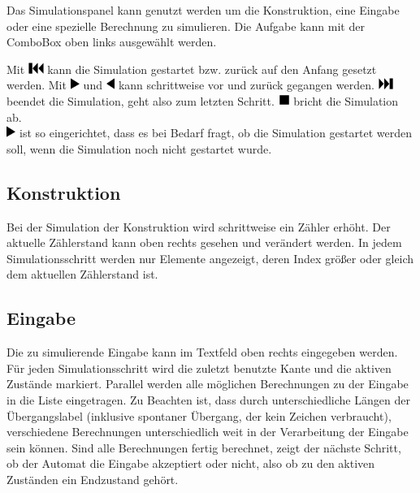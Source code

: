 Das Simulationspanel kann genutzt werden um die Konstruktion, eine Eingabe oder eine spezielle Berechnung zu simulieren. Die Aufgabe kann mit der ComboBox oben links ausgewählt werden.

Mit \includegraphics[height=1em]{pic/icons/beginning} kann die Simulation gestartet bzw. zurück auf den Anfang gesetzt werden. Mit \includegraphics[height=1em]{pic/icons/next} und \includegraphics[height=1em]{pic/icons/last} kann schrittweise vor und zurück gegangen werden. \includegraphics[height=1em]{pic/icons/end} beendet die Simulation, geht also zum letzten Schritt. \includegraphics[height=1em]{pic/icons/stop} bricht die Simulation ab.\\
\includegraphics[height=1em]{pic/icons/next} ist so eingerichtet, dass es bei Bedarf fragt, ob die Simulation gestartet werden soll, wenn die Simulation noch nicht gestartet wurde.
\subsection{Konstruktion}
Bei der Simulation der Konstruktion wird schrittweise ein Zähler erhöht. Der aktuelle Zählerstand kann oben rechts gesehen und verändert werden. In jedem Simulationsschritt werden nur Elemente angezeigt, deren Index größer oder gleich dem aktuellen Zählerstand ist.
\subsection{Eingabe}
Die zu simulierende Eingabe kann im Textfeld oben rechts eingegeben werden. Für jeden Simulationsschritt wird die zuletzt benutzte Kante und die aktiven Zustände markiert. Parallel werden alle möglichen Berechnungen zu der Eingabe in die Liste eingetragen. Zu Beachten ist, dass durch unterschiedliche Längen der Übergangslabel (inklusive spontaner Übergang, der kein Zeichen verbraucht), verschiedene Berechnungen unterschiedlich weit in der Verarbeitung der Eingabe sein können. Sind alle Berechnungen fertig berechnet, zeigt der nächste Schritt, ob der Automat die Eingabe akzeptiert oder nicht, also ob zu den aktiven Zuständen ein Endzustand gehört.

